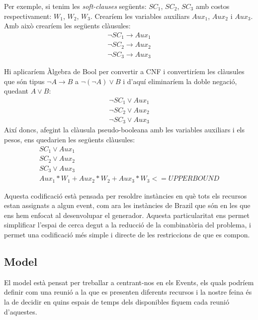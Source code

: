 \documentclass[11pt,a4paper,twoside]{report}
\begin{document}
  Per exemple, si tenim les \textit{soft-clauses} següents: $SC_1$, $SC_2$, $SC_3$ amb costos respectivament: $W_1$, $W_2$, $W_3$. 
  Crearíem les variables auxiliars $Aux_1$, $Aux_2$ i $Aux_3$. Amb això crearíem les següents clàusules:
  \begin{gather*}
    \neg SC_1 \rightarrow Aux_1 \\
    \neg SC_2 \rightarrow Aux_2 \\
    \neg SC_3 \rightarrow Aux_3
  \end{gather*}

  Hi aplicaríem Àlgebra de Bool per convertir a CNF i convertiríem les clàusules que són tipus $\neg A \rightarrow B$ a $\neg (\neg A) \vee B$ i d'aquí eliminaríem la doble negació, quedant $A \vee B$:
  \begin{gather*}
    \neg SC_1 \vee Aux_1 \\
    \neg SC_2 \vee Aux_2 \\
    \neg SC_3 \vee Aux_3
  \end{gather*}
  Així doncs, afegint la clàusula pseudo-booleana amb les variables auxiliars i els pesos, ens quedarien les següents clàusules:
  \begin{gather*}
      SC_1 \vee Aux_1 \\
      SC_2 \vee Aux_2 \\
      SC_3 \vee Aux_3 \\
      Aux_1*W_1 + Aux_2*W_2 + Aux_3*W_3 <= UPPERBOUND
  \end{gather*}


  Aquesta codificació està pensada per resoldre instàncies en què tots els recursos estan assignats a algun event, com ara les instàncies de Brazil que són en les que ens hem enfocat al desenvolupar el generador. 
  Aquesta particularitat ens permet simplificar l'espai de cerca degut a la reducció de la combinatòria del problema, i permet una codificació més simple i directe de les restriccions de que es compon.

  \subsection{Model}

  El model està pensat per treballar a centrant-nos en els Events, els quals podríem definir com una reunió a la que es presenten diferents recursos i la nostre feina és la de decidir en quins espais de temps dels disponibles fiquem cada reunió d'aquestes.
\end{document}
